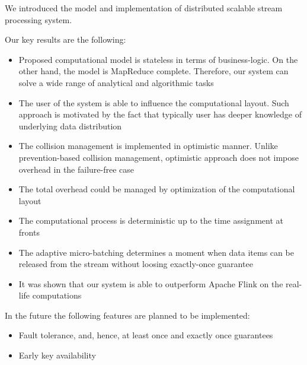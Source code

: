 
\label {fs-conclusions}

We introduced the model and implementation of distributed scalable stream processing system. 

Our key results are the following:

\begin{itemize}
    \item Proposed computational model is stateless in terms of business-logic. On the other hand, the model is MapReduce complete. Therefore, our system can solve a wide range of analytical and algorithmic tasks
    \item The user of the system is able to influence the computational layout. Such approach is motivated by the fact that typically user has deeper knowledge of underlying data distribution
    \item The collision management is implemented in optimistic manner. Unlike prevention-based collision management, optimistic approach does not impose overhead in the failure-free case
    \item The total overhead could be managed by optimization of the computational layout
    \item The computational process is deterministic up to the time assignment at fronts
    \item The adaptive micro-batching determines a moment when data items can be released from the stream without loosing exactly-once guarantee  
    \item It was shown that our system is able to outperform Apache Flink on the real-life computations
\end{itemize}

In the future the following features are planned to be implemented:
\begin{itemize}
    \item Fault tolerance, and, hence, at least once and exactly once guarantees
    \item Early key availability
\end{itemize}
